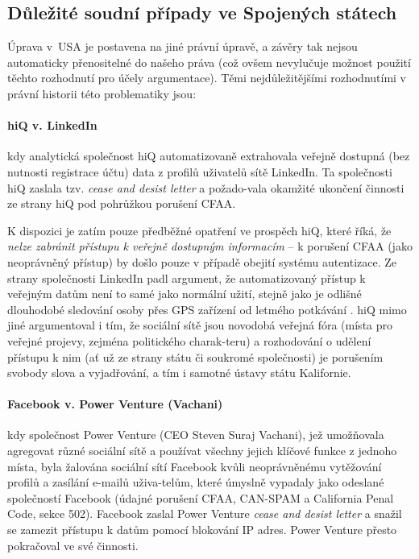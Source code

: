 \documentclass[thesis=B,czech]{FITthesis}[2012/06/26]
\begin{document}
\subsection{Důležité soudní případy ve Spojených státech}
Úprava v USA je postavena na jiné právní úpravě, a závěry tak nejsou automaticky přenositelné do našeho práva (což ovšem nevylučuje možnost použití těchto rozhodnutí pro účely argumentace). Těmi nejdůležitějšími rozhodnutími v právní historii této problematiky jsou:

\paragraph{hiQ v. LinkedIn} kdy analytická společnost hiQ automatizovaně extrahovala veřejně dostupná (bez nutnosti registrace účtu) data z profilů uživatelů sítě LinkedIn. Ta společnosti hiQ zaslala tzv. \textit{cease and desist letter} a požado-vala okamžité ukončení činnosti ze strany hiQ pod pohrůžkou porušení CFAA.\cite{hiq_linkedin_1}

K dispozici je zatím pouze předběžné opatření ve prospěch hiQ, které říká, že \textit{nelze zabránit přístupu k veřejně dostupným informacím} -- k porušení CFAA (jako neoprávněný přístup) by došlo pouze v případě obejití systému autentizace. Ze strany společnosti LinkedIn padl argument, že automatizovaný přístup k veřejným datům není to samé jako normální  užití, stejně jako je odlišné dlouhodobé sledování osoby přes GPS zařízení od letmého potkávání \cite{linkedin_arg}. hiQ mimo jiné argumentoval i tím, že sociální sítě jsou novodobá veřejná fóra (místa pro veřejné projevy, zejména politického charak-teru\cite{public_forum}) a rozhodování o udělení přístupu k nim (ať už ze strany státu či soukromé společnosti) je porušením svobody slova a vyjadřování, a tím i samotné ústavy státu Kalifornie.\cite{hiq_linkedin_2}

\paragraph{Facebook v. Power Venture (Vachani)} kdy společnost Power Venture (CEO Steven Suraj Vachani), jež umožňovala agregovat různé sociální sítě a používat všechny jejich klíčové funkce z jednoho místa, byla žalována sociální sítí Facebook kvůli neoprávněnému vytěžování profilů a zasílání e-mailů uživa-telům, které úmyslně vypadaly jako odeslané společností Facebook (údajné porušení CFAA, CAN-SPAM a California Penal Code, sekce 502). Facebook zaslal Power Venture \textit{cease and desist letter} a snažil se zamezit přístupu k datům pomocí blokování IP adres. Power Venture přesto pokračoval ve své činnosti.\cite{facebook_venture_1}
\end{document}
